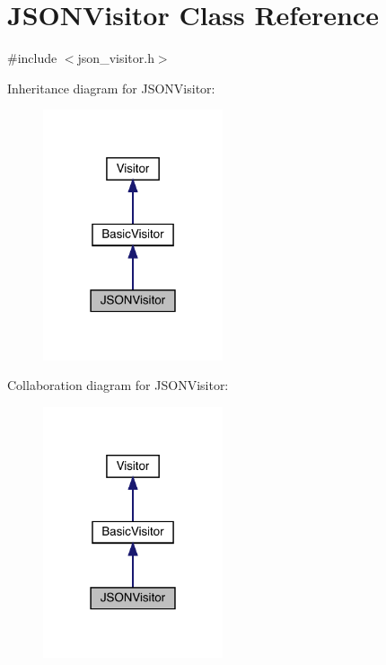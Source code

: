 \hypertarget{class_j_s_o_n_visitor}{}\section{J\+S\+O\+N\+Visitor Class Reference}
\label{class_j_s_o_n_visitor}


{\ttfamily \#include $<$json\+\_\+visitor.\+h$>$}



Inheritance diagram for J\+S\+O\+N\+Visitor\+:
\nopagebreak
\begin{figure}[H]
\begin{center}
\leavevmode
\includegraphics[width=150pt]{class_j_s_o_n_visitor__inherit__graph}
\end{center}
\end{figure}


Collaboration diagram for J\+S\+O\+N\+Visitor\+:
\nopagebreak
\begin{figure}[H]
\begin{center}
\leavevmode
\includegraphics[width=150pt]{class_j_s_o_n_visitor__coll__graph}
\end{center}
\end{figure}
